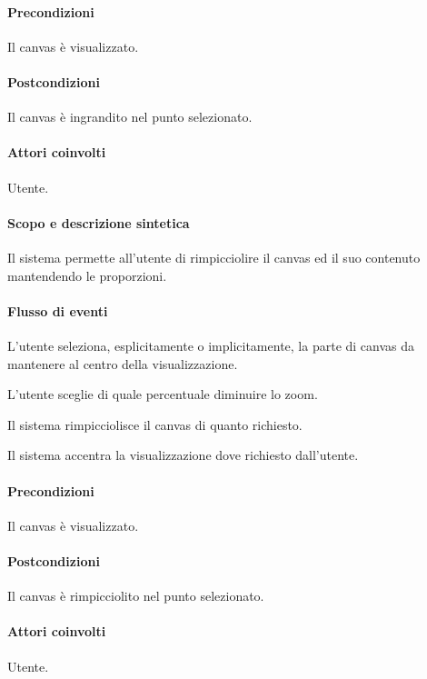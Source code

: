 \paragraph{Precondizioni} Il canvas \`e visualizzato.
\paragraph{Postcondizioni} Il canvas \`e ingrandito nel punto selezionato.

\paragraph{Attori coinvolti} Utente.
\paragraph{Scopo e descrizione sintetica} 
Il sistema permette all'utente di rimpicciolire il canvas ed il suo contenuto mantendendo le proporzioni.
\paragraph{Flusso di eventi}
\begin{elenconumerato}[\textbf{}]{\subsubsecindent}
\item L'utente seleziona, esplicitamente o implicitamente, la parte di canvas da mantenere al centro della visualizzazione.
\item L'utente sceglie di quale percentuale diminuire lo zoom.
\item Il sistema rimpicciolisce il canvas di quanto richiesto.
\item Il sistema accentra la visualizzazione dove richiesto dall'utente.
\end{elenconumerato}
\paragraph{Precondizioni} Il canvas \`e visualizzato.
\paragraph{Postcondizioni} Il canvas \`e rimpicciolito nel punto selezionato.

\paragraph{Attori coinvolti} Utente.
